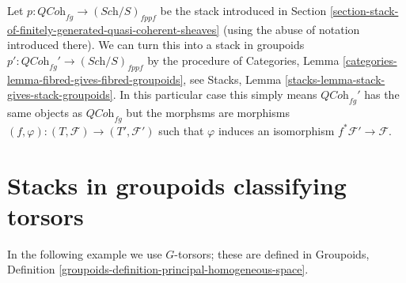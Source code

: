 \noindent
Let $p : \textit{QCoh}_{fg} \to (\textit{Sch}/S)_{fppf}$ be the stack
introduced in
Section \ref{section-stack-of-finitely-generated-quasi-coherent-sheaves}
(using the abuse of notation introduced there).
We can turn this into a stack in groupoids
$p' : \textit{QCoh}_{fg}' \to (\textit{Sch}/S)_{fppf}$ by
the procedure of
Categories, Lemma \ref{categories-lemma-fibred-gives-fibred-groupoids},
see
Stacks, Lemma \ref{stacks-lemma-stack-gives-stack-groupoids}.
In this particular case this simply means $\textit{QCoh}_{fg}'$ has
the same objects as $\textit{QCoh}_{fg}$ but the morphsms are
morphisms $(f, \varphi) : (T, \mathcal{F}) \to (T', \mathcal{F}')$
such that $\varphi$ induces an isomorphism $f^*\mathcal{F}' \to \mathcal{F}$.






\section{Stacks in groupoids classifying torsors}
\label{section-torsors}

\medskip\noindent
In the following example we use $G$-torsors; these are defined in
Groupoids, Definition \ref{groupoids-definition-principal-homogeneous-space}.

